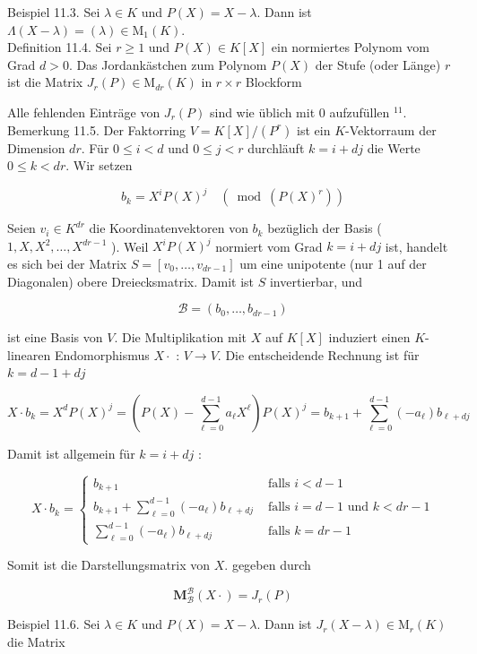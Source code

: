 \documentclass[10pt, letterpaper]{article}
\begin{document}
Beispiel 11.3. Sei $\lambda \in K$ und $P(X)=X-\lambda$. Dann ist $\Lambda(X-\lambda)=(\lambda) \in \mathrm{M}_{1}(K)$.\\
Definition 11.4. Sei $r \geq 1$ und $P(X) \in K[X]$ ein normiertes Polynom vom Grad $d>0$. Das Jordankästchen zum Polynom $P(X)$ der Stufe (oder Länge) $r$ ist die Matrix $J_{r}(P) \in \mathrm{M}_{d r}(K)$ in $r \times r$ Blockform

Alle fehlenden Einträge von $J_{r}(P)$ sind wie üblich mit 0 aufzufüllen ${ }^{11}$.\\
Bemerkung 11.5. Der Faktorring $V=K[X] /\left(P^{r}\right)$ ist ein $K$-Vektorraum der Dimension $d r$. Für $0 \leq i<d$ und $0 \leq j<r$ durchläuft $k=i+d j$ die Werte $0 \leq k<d r$. Wir setzen

$$
b_{k}=X^{i} P(X)^{j} \quad\left(\bmod \left(P(X)^{r}\right)\right)
$$

Seien $v_{i} \in K^{d r}$ die Koordinatenvektoren von $b_{k}$ bezüglich der Basis ( $1, X, X^{2}, \ldots, X^{d r-1}$ ). Weil $X^{i} P(X)^{j}$ normiert vom Grad $k=i+d j$ ist, handelt es sich bei der Matrix $S=\left[v_{0}, \ldots, v_{d r-1}\right]$ um eine unipotente (nur 1 auf der Diagonalen) obere Dreiecksmatrix. Damit ist $S$ invertierbar, und

$$
\mathscr{B}=\left(b_{0}, \ldots, b_{d r-1}\right)
$$

ist eine Basis von $V$. Die Multiplikation mit $X$ auf $K[X]$ induziert einen $K$-linearen Endomorphismus $X \cdot$ : $V \rightarrow V$. Die entscheidende Rechnung ist für $k=d-1+d j$

$$
X \cdot b_{k}=X^{d} P(X)^{j}=\left(P(X)-\sum_{\ell=0}^{d-1} a_{\ell} X^{\ell}\right) P(X)^{j}=b_{k+1}+\sum_{\ell=0}^{d-1}\left(-a_{\ell}\right) b_{\ell+d j}
$$

Damit ist allgemein für $k=i+d j$ :

$$
X \cdot b_{k}= \begin{cases}b_{k+1} & \text { falls } i<d-1 \\ b_{k+1}+\sum_{\ell=0}^{d-1}\left(-a_{\ell}\right) b_{\ell+d j} & \text { falls } i=d-1 \text { und } k<d r-1 \\ \sum_{\ell=0}^{d-1}\left(-a_{\ell}\right) b_{\ell+d j} & \text { falls } k=d r-1\end{cases}
$$

Somit ist die Darstellungsmatrix von $X$. gegeben durch

$$
\mathbf{M}_{\mathscr{B}}^{\mathscr{B}}(X \cdot)=J_{r}(P)
$$

Beispiel 11.6. Sei $\lambda \in K$ und $P(X)=X-\lambda$. Dann ist $J_{r}(X-\lambda) \in \mathrm{M}_{r}(K)$ die Matrix
\end{document}
